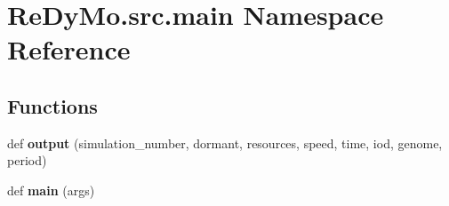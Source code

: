 \hypertarget{namespaceReDyMo_1_1src_1_1main}{}\section{Re\+Dy\+Mo.\+src.\+main Namespace Reference}
\label{namespaceReDyMo_1_1src_1_1main}
\subsection*{Functions}
\begin{DoxyCompactItemize}
\item 
\mbox{\label{namespaceReDyMo_1_1src_1_1main_ae58b3c204de0e27f11b621585f2f66a6}} 
def {\bfseries output} (simulation\+\_\+number, dormant, resources, speed, time, iod, genome, period)
\item 
\mbox{\label{namespaceReDyMo_1_1src_1_1main_ac4c32136c664ed8e5546f8b772a8caeb}} 
def {\bfseries main} (args)
\end{DoxyCompactItemize}
